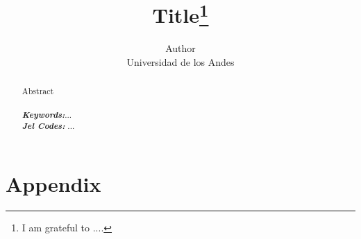 \documentclass[12pt,english,a4paper,nosumlimits]{article}
\title{\textbf{Title\thanks{I am grateful to .... }}\vspace{3ex}}
\author{
	Author \\
 Universidad de los Andes
}
\numberwithin{equation}{section}
\begin{document}
\clearpage
\maketitle
\thispagestyle{empty}
\vspace{-0.15cm}
\vspace{-1cm}

\begin{abstract}
\noindent Abstract   \\ \\



\noindent \textbf{\textit{Keywords:}}... \\
\noindent \textbf{\textit{Jel Codes:}} ... \\
\end{abstract}


\newpage	
	\setcounter{page}{1}
	\onehalfspace


\newpage







\newpage
\section{Appendix}
\end{document}

